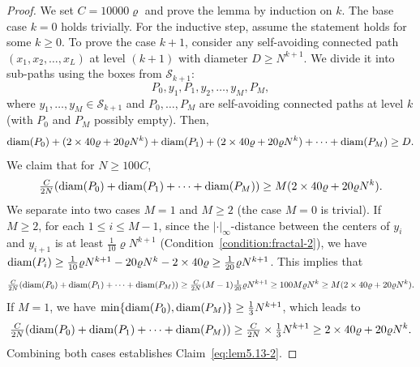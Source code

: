 \documentclass[a4paper]{article}
\numberwithin{equation}{section}
\numberwithin{equation}{section}
\renewcommand{\1}{\mathbf{1}}
\begin{document}
\begin{proof}
    We set $C = 10000 \varrho$ and prove the lemma by induction on $k$. The base case $k = 0$ holds trivially. For the inductive step, assume the statement holds for some $k \ge 0$. To prove the case $k+1$, consider any self-avoiding connected path $(x_1, x_2, \ldots, x_L)$ at level $(k+1)$ with diameter $D \geq N^{k+1}$. We divide it into sub-paths using the boxes from $\mathcal{S}_{k+1}$:
    $$ P_0, y_1, P_1, y_2, \ldots, y_M, P_M, $$
    where $y_1,\ldots,y_M \in \mathcal S_{k+1}$ and $P_0,\ldots,P_M$ are self-avoiding connected paths at level $k$ (with $P_0$ and $P_M$ possibly empty). Then,
    \begin{equation}\label{eq:lem5.13-1}
        {\rm diam}(P_0) + (2 \times 40\varrho + 20\varrho N^k) + {\rm diam}(P_1) + (2 \times 40\varrho + 20\varrho N^k) + \cdots +{\rm diam}(P_M) \geq D.
    \end{equation}
    We claim that for $N \geq 100 C$, 
    \begin{equation}\label{eq:lem5.13-2}
        \tfrac{C}{2N} ({\rm diam}(P_0) + {\rm diam}(P_1) + \cdots +  {\rm diam}(P_M)) \geq M (2 \times 40\varrho + 20\varrho N^k).
    \end{equation}
    We separate into two cases $M = 1$ and $M \geq 2$ (the case $M = 0$ is trivial). If $M \geq 2$, for each $1 \leq i \leq M-1$, since the $|\cdot|_\infty$-distance between the centers of $y_i$ and $y_{i+1}$ is at least $\frac{1}{10} \varrho N^{k+1}$ (Condition~\ref{condition:fractal-2}), we have ${\rm diam}(P_i) \geq \frac{1}{10} \varrho N^{k+1} - 20\varrho N^k - 2 \times 40 \varrho\geq \frac{1}{20} \varrho N^{k+1}$. This implies that
    $$
    \tfrac{C}{2N} ({\rm diam}(P_0) + {\rm diam}(P_1) + \cdots +  {\rm diam}(P_M)) \geq \tfrac{C}{2N} (M-1) \tfrac{1}{20} \varrho N^{k+1} \geq 100 M\varrho N^k \geq M(2 \times 40\varrho + 20\varrho N^k).
    $$
    If $M = 1$, we have $\min \{ {\rm diam}(P_0), {\rm diam}(P_M) \} \geq \frac{1}{3} N^{k+1}$, which leads to
    $$
    \tfrac{C}{2N} ({\rm diam}(P_0) + {\rm diam}(P_1) + \cdots +  {\rm diam}(P_M)) \geq \tfrac{C}{2N} \times \tfrac{1}{3} N^{k+1} \geq 2 \times 40\varrho + 20\varrho N^k.
    $$
    Combining both cases establishes Claim~\eqref{eq:lem5.13-2}.
    

\end{proof}
\end{document}
